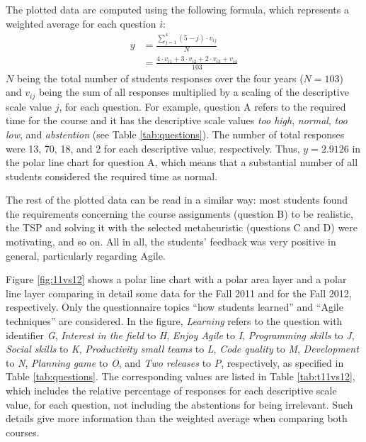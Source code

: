 \documentclass[conference]{IEEEtran}
\begin{document}
The plotted data are computed using the following formula, which represents a weighted average for each question $i$:
\begin{align*}
y &= \frac{\sum\limits_{j=1}^4 (5-j) \cdot v_{ij}}{N}\\
&= \frac{4 \cdot v_{i1} + 3 \cdot v_{i2} + 2 \cdot v_{i3} + v_{i4}}{103}
\end{align*}
$N$ being the total number of students responses over the four years ($N=103$) and $v_{ij}$ being the sum of all responses multiplied by a scaling of the descriptive scale value $j$, for each question. For example, question A refers to the required time for the course and it has the descriptive scale values \textit{too high}, \textit{normal}, \textit{too low}, and \textit{abstention} (see Table \ref{tab:questions}). The number of total responses were 13, 70, 18, and 2 for each descriptive value, respectively. Thus, $y=2.9126$ in the polar line chart for question A, which means that a substantial number of all students considered the required time as normal.

The rest of the plotted data can be read in a similar way: most students found the requirements concerning the course assignments (question B) to be realistic, the TSP and solving it with the selected metaheuristic (questions C and D) were motivating, and so on. All in all, the students' feedback was very positive in general, particularly regarding Agile.

Figure \ref{fig:11vs12} shows a polar line chart with a polar area layer and a polar line layer comparing in detail some data for the Fall 2011 and for the Fall 2012, respectively. Only the questionnaire topics ``how students learned'' and ``Agile techniques'' are considered. In the figure, \textit{Learning} refers to the question with identifier \textit{G}, \textit{Interest in the field} to \textit{H}, \textit{Enjoy Agile} to \textit{I}, \textit{Programming skills} to \textit{J}, \textit{Social skills} to \textit{K}, \textit{Productivity small teams} to \textit{L}, \textit{Code quality} to \textit{M}, \textit{Development} to \textit{N}, \textit{Planning game} to \textit{O}, and \textit{Two releases} to \textit{P}, respectively, as specified in Table \ref{tab:questions}. The corresponding values are listed in Table \ref{tab:t11vs12}, which includes the relative percentage of responses for each descriptive scale value, for each question, not including the abstentions for being irrelevant. Such details give more information than the weighted average when comparing both courses.
\end{document}
